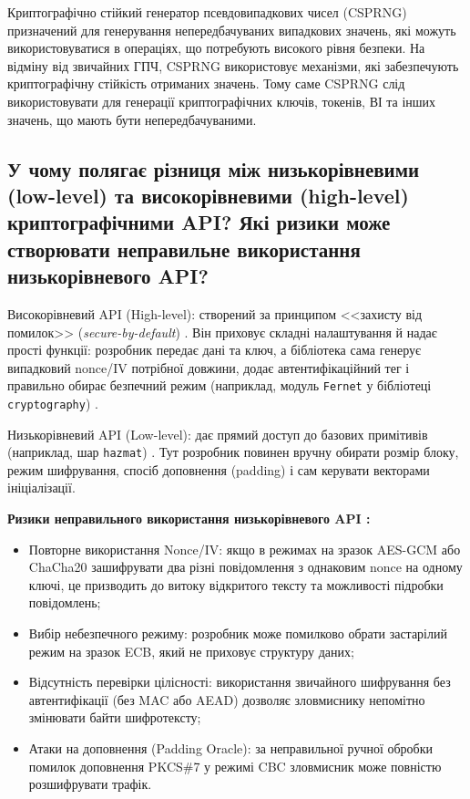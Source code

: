 Криптографічно стійкий генератор псевдовипадкових чисел (CSPRNG) призначений для генерування непередбачуваних випадкових значень, 
які можуть використовуватися в операціях, що потребують високого рівня безпеки. На відміну від звичайних ГПЧ, CSPRNG використовує механізми, 
які забезпечують криптографічну стійкість отриманих значень. Тому саме CSPRNG слід використовувати для генерації криптографічних ключів, токенів, 
ВІ та інших значень, що мають бути непередбачуваними. \cite{Cheat Sheet}


\subsection{У чому полягає різниця між низькорівневими (low-level) та високорівневими (high-level) криптографічними API? Які ризики може створювати неправильне використання низькорівневого API?}

Високорівневий API (High-level): створений за принципом <<захисту від помилок>> (\textit{secure-by-default}) \cite{Tink}. Він приховує складні налаштування й надає прості функції: розробник передає дані та ключ, а бібліотека сама генерує випадковий nonce/IV потрібної довжини, додає автентифікаційний тег і правильно обирає безпечний режим (наприклад, модуль \texttt{Fernet} у бібліотеці \texttt{cryptography}) \cite{cryptography}.
 
Низькорівневий API (Low-level): дає прямий доступ до базових примітивів (наприклад, шар \texttt{hazmat}) \cite{cryptography, cryptography git}. Тут розробник повинен вручну обирати розмір блоку, режим шифрування, спосіб доповнення (padding) і сам керувати векторами ініціалізації.


\textbf{Ризики неправильного використання низькорівневого API \cite{OWASP, Libsodium}:}
\begin{itemize}
    \item Повторне використання Nonce/IV: якщо в режимах на зразок AES-GCM або ChaCha20 зашифрувати два різні повідомлення з однаковим nonce на одному ключі, це призводить до витоку відкритого тексту та можливості підробки повідомлень;
    \item Вибір небезпечного режиму: розробник може помилково обрати застарілий режим на зразок ECB, який не приховує структуру даних;
    \item Відсутність перевірки цілісності: використання звичайного шифрування без автентифікації (без MAC або AEAD) дозволяє зловмиснику непомітно змінювати байти шифротексту;
    \item Атаки на доповнення (Padding Oracle): за неправильної ручної обробки помилок доповнення PKCS\#7 у режимі CBC зловмисник може повністю розшифрувати трафік.
\end{itemize}


